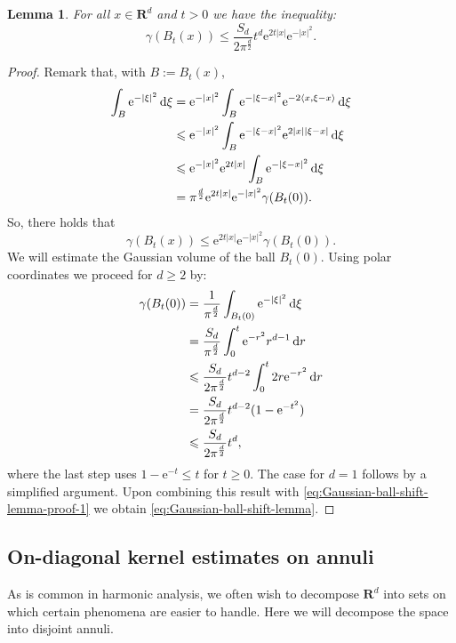 \documentclass{amsart}
\newtheorem{lemma}{Lemma}
\theoremstyle{remark}
\newcommand{\D}{\,\textup{d}}
\newcommand{\la}{\langle}
\newcommand{\ra}{\rangle}
\renewcommand{\leq}{\leqslant}
\renewcommand{\geq}{\geqslant}
\newcommand{\R}{\mathbf R}
\newcommand{\e}{\mathrm{e}} %
\begin{document}
\begin{lemma}\label{lem:Gaussian-ball-shift-lemma}
  For all $x \in \R^d$ and $t > 0$ we have the inequality:
  \begin{equation}\label{eq:Gaussian-ball-shift-lemma}
    \gamma(B_t(x)) \leq  \frac{S_d}{2 \pi^{\frac{d}{2}}} t^d \e^{2t|x|} \e^{-|x|^2}. 
  \end{equation}
\end{lemma}
\begin{proof}
  Remark that, with $B := B_t(x)$,
  \begin{align*}
    \int_B \e^{-|\xi|^2} \D\xi &= \e^{-|x|^2} \int_{B} \e^{-|\xi -
      x|^2} \e^{-2 \la x, \xi - x \ra} \D\xi\\
    &\leq \e^{-|x|^2} \int_{B} \e^{-|\xi - x|^2} \e^{2 |x| |\xi - x|}
    \D\xi\\
    &\leq \e^{-|x|^2} \e^{2 t|x|} \int_{B} \e^{-|\xi - x|^2} \D\xi\\
    &= \pi^{\frac{d}2} \e^{2 t|x|} \e^{-|x|^2} \gamma(B_t(0)).
  \end{align*}
  So, there holds that
  \begin{equation}\label{eq:Gaussian-ball-shift-lemma-proof-1}
    \gamma(B_t(x)) \leq \e^{2 t|x|} \e^{-|x|^2} \gamma(B_t(0)).
  \end{equation}
  We will estimate the Gaussian volume of the ball $B_t(0)$. Using polar coordinates
  we proceed for $d \geq 2$ by: 
  \begin{align*}
    \gamma(B_t(0)) &= \frac1{\pi^{\frac{d}2}} \int_{B_t(0)} \e^{-|\xi|^2} \D\xi\\
    &= \frac{S_d}{\pi^{\frac{d}2}} \int_0^t \e^{-r^2} r^{d - 1} \D{r}\\
    &\leq \frac{S_d}{2 \pi^{\frac{d}2}} t^{d-2} \int_0^t 2r \e^{-r^2} \D{r}\\
    &= \frac{S_d}{2 \pi^{\frac{d}2}} t^{d-2} (1-\e^{-t^2})\\
    &\leq \frac{S_d}{2 \pi^{\frac{d}2}} t^d,
  \end{align*}
  where the last step uses $1 - \e^{-t} \leq t$ for $t \geq 0$. The case
  for $d = 1$ follows by a simplified argument. Upon combining this
  result with \eqref{eq:Gaussian-ball-shift-lemma-proof-1} we obtain
  \eqref{eq:Gaussian-ball-shift-lemma}.
\end{proof}

\subsection{On-diagonal kernel estimates on annuli}
As is common in harmonic analysis, we often wish to decompose
$\R^d$ into sets on which certain phenomena are easier to handle. Here
we will decompose the space into disjoint annuli. 
\end{document}
